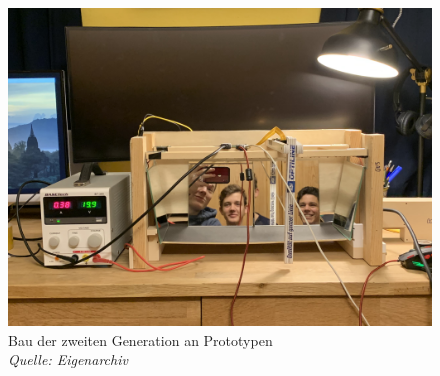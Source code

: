 \documentclass[11pt,a4paper]{article}
\begin{document}
\begin{figure}[H] \label{fig:second-generation-production}
    \centering
    \includegraphics[width=.8\textwidth]{images/Gruppe Semi.jpg}
    \caption{Bau der zweiten Generation an Prototypen\\
    \textit{Quelle: Eigenarchiv}}
\end{figure}
\end{document}
